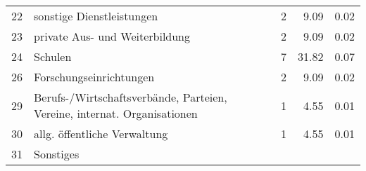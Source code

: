 \begin{longtable}{lXrrr}
     22 &
     \multicolumn{1}{X}{ sonstige Dienstleistungen   } &


       \num{2} &
       \num[round-mode=places,round-precision=2]{9,09} &
         \num[round-mode=places,round-precision=2]{0,02} \\

     23 &
     \multicolumn{1}{X}{ private Aus- und Weiterbildung   } &


       \num{2} &
       \num[round-mode=places,round-precision=2]{9,09} &
         \num[round-mode=places,round-precision=2]{0,02} \\

     24 &
     \multicolumn{1}{X}{ Schulen   } &


       \num{7} &
       \num[round-mode=places,round-precision=2]{31,82} &
         \num[round-mode=places,round-precision=2]{0,07} \\

     26 &
     \multicolumn{1}{X}{ Forschungseinrichtungen   } &


       \num{2} &
       \num[round-mode=places,round-precision=2]{9,09} &
         \num[round-mode=places,round-precision=2]{0,02} \\

     29 &
     \multicolumn{1}{X}{ Berufs-/Wirtschaftsverbände, Parteien, Vereine, internat. Organisationen   } &


       \num{1} &
       \num[round-mode=places,round-precision=2]{4,55} &
         \num[round-mode=places,round-precision=2]{0,01} \\

     30 &
     \multicolumn{1}{X}{ allg. öffentliche Verwaltung   } &


       \num{1} &
       \num[round-mode=places,round-precision=2]{4,55} &
         \num[round-mode=places,round-precision=2]{0,01} \\

     31 &
     \multicolumn{1}{X}{ Sonstiges   } &



\end{longtable}
